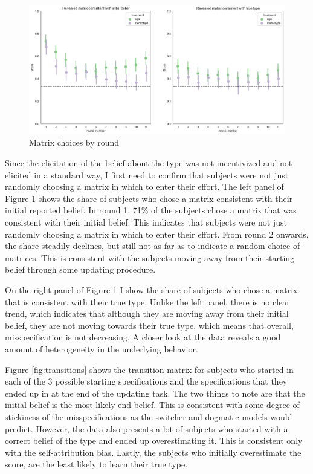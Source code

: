 \documentclass[
  12pt,
]{article}
\begin{document}
\begin{figure}
\hypertarget{fig:matrix-choices-by-round}{%
\centering
\includegraphics{../figures/last_button_consistency.png}
\caption{Matrix choices by round}\label{fig:matrix-choices-by-round}
}
\end{figure}

Since the elicitation of the belief about the type was not incentivized
and not elicited in a standard way, I first need to confirm that
subjects were not just randomly choosing a matrix in which to enter
their effort. The left panel of Figure \ref{fig:matrix-choices-by-round}
shows the share of subjects who chose a matrix consistent with their
initial reported belief. In round 1, 71\% of the subjects chose a matrix
that was consistent with their initial belief. This indicates that
subjects were not just randomly choosing a matrix in which to enter
their effort. From round 2 onwards, the share steadily declines, but
still not as far as to indicate a random choice of matrices. This is
consistent with the subjects moving away from their starting belief
through some updating procedure.

On the right panel of Figure \ref{fig:matrix-choices-by-round} I show
the share of subjects who chose a matrix that is consistent with their
true type. Unlike the left panel, there is no clear trend, which
indicates that although they are moving away from their initial belief,
they are not moving towards their true type, which means that overall,
misspecification is not decreasing. A closer look at the data reveals a
good amount of heterogeneity in the underlying behavior.

Figure \ref{fig:transitions} shows the transition matrix for subjects
who started in each of the 3 possible starting specifications and the
specifications that they ended up in at the end of the updating task.
The two things to note are that the initial belief is the most likely
end belief. This is consistent with some degree of stickiness of the
misspecifications as the switcher and dogmatic models would predict.
However, the data also presents a lot of subjects who started with a
correct belief of the type and ended up overestimating it. This is
consistent only with the self-attribution bias. Lastly, the subjects who
initially overestimate the score, are the least likely to learn their
true type.
\end{document}
